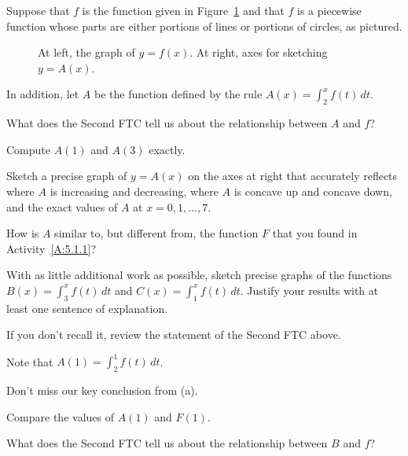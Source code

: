 \begin{activity} \label{A:5.2.1}  Suppose that $f$ is the function given in Figure~\ref{F:5.2.Act1} and that $f$ is a piecewise function whose parts are either portions of lines or portions of circles, as pictured.
\begin{figure}[h]
\begin{center}
\end{center}
\caption{At left, the graph of $y = f(x)$.  At right, axes for sketching $y = A(x)$.} \label{F:5.2.Act1}
\end{figure}
In addition, let $A$ be the function defined by the rule $A(x) = \int_2^x f(t) \, dt$.
\ba
	\item What does the Second FTC tell us about the relationship between $A$ and $f$?
	\item Compute $A(1)$ and $A(3)$ exactly.
	\item Sketch a precise graph of $y = A(x)$ on the axes at right that accurately reflects where $A$ is increasing and decreasing, where $A$ is concave up and concave down, and the exact values of $A$ at $x = 0, 1, \ldots, 7$.
	\item How is $A$ similar to, but different from, the function $F$ that you found in Activity~\ref{A:5.1.1}?
	\item With as little additional work as possible, sketch precise graphs of the functions $B(x) = \int_3^x f(t) \, dt$ and $C(x) = \int_1^x f(t) \, dt$.  Justify your results with at least one sentence of explanation.
\ea
\end{activity}
\begin{smallhint}
\ba
	\item If you don't recall it, review the statement of the Second FTC above.
	\item Note that $A(1)= \int_2^1 f(t) \, dt$.
	\item Don't miss our key conclusion from (a).
	\item Compare the values of $A(1)$ and $F(1)$.
	\item What does the Second FTC tell us about the relationship between $B$ and $f$?
\ea
\end{smallhint}
